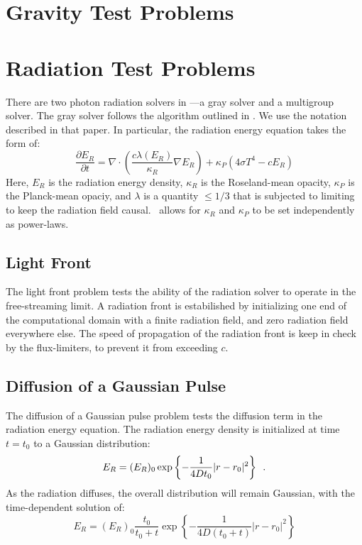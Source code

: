 \section{Gravity Test Problems}



\section{Radiation Test Problems}

There are two photon radiation solvers in \castro---a gray solver and a
multigroup solver.  The gray solver follows the algorithm outlined
in \cite{howellgreenough:2003}.  We use the notation described in that
paper.  In particular, the radiation energy equation takes the form
of:
\begin{equation}
\frac{\partial E_R}{\partial t} = 
 \nabla \cdot \left ( \frac{c \lambda(E_R)}{\kappa_R} \nabla E_R \right ) +
 \kappa_P (4 \sigma T^4 - c E_R )
\end{equation}
Here, $E_R$ is the radiation energy density, $\kappa_R$ is the
Roseland-mean opacity, $\kappa_P$ is the Planck-mean opaciy, and
$\lambda$ is a quantity $\le 1/3$ that is subjected to limiting to
keep the radiation field causal.  \castro\ allows for $\kappa_R$
and $\kappa_P$ to be set independently as power-laws.

\subsection{Light Front}

The light front problem tests the ability of the radiation solver to
operate in the free-streaming limit.  A radiation front is
estabilished by initializing one end of the computational domain with
a finite radiation field, and zero radiation field everywhere else.
The speed of propagation of the radiation front is keep in check by
the flux-limiters, to prevent it from exceeding $c$.


\subsection{Diffusion of a Gaussian Pulse}

The diffusion of a Gaussian pulse problem tests the diffusion term in
the radiation energy equation.  The radiation energy density is 
initialized at time $t = t_0$ to a Gaussian distribution:
\begin{equation}
E_R = (E_R)_0 \exp \left \{ - \frac{1}{4 D t_0} |r - r_0|^2 \right \} \enskip .
\end{equation}
As the radiation diffuses, the overall distribution will remain 
Gaussian, with the time-dependent solution of:
\begin{equation}
E_R = (E_R)_0 \frac{t_0}{t_0 + t} \exp \left \{ -\frac{1}{4 D (t_0 + t)} |r - r_0|^2 \right \}
\end{equation}



